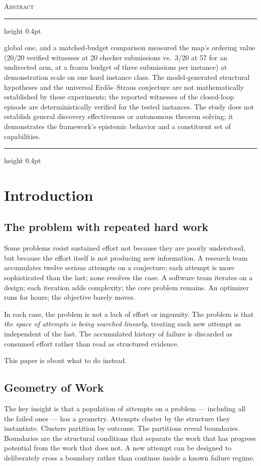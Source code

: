 \documentclass[11pt]{article}
\renewenvironment{abstract}{%
  \begin{center}
  \begin{minipage}{0.86\textwidth}
  \begin{center}{\normalfont\scshape\color{gowaccent}Abstract}\end{center}
  \vspace{0.4em}
  {\color{gowrule}\hrule height 0.4pt}
  \vspace{0.9em}
  \small\noindent\ignorespaces
}{%
  \vspace{0.9em}
  {\color{gowrule}\hrule height 0.4pt}
  \end{minipage}
  \end{center}
  \vspace{1.2em}
}
\theoremstyle{gowthm}
\theoremstyle{gowplain}
\begin{document}
\begin{abstract}
global one, and a matched-budget comparison measured the map's ordering value
(20/20 verified witnesses at 20 checker submissions vs.\ 3/20 at 57 for an
undirected arm, at a frozen budget of three submissions per instance) at
demonstration scale on one hard instance class. The model-generated structural
hypotheses and the universal Erd\H{o}s--Straus conjecture are not
mathematically established by these experiments; the reported witnesses of the
closed-loop episode are deterministically verified for the tested instances.
The study does not establish general discovery effectiveness or autonomous
theorem solving; it demonstrates the framework's epistemic behavior and a
constituent set of capabilities.
\end{abstract}

\section{Introduction}
\label{sec:intro}

\subsection{The problem with repeated hard work}

Some problems resist sustained effort not because they are poorly understood,
but because the effort itself is not producing new information. A research team
accumulates twelve serious attempts on a conjecture; each attempt is more
sophisticated than the last; none resolves the case. A software team iterates
on a design; each iteration adds complexity; the core problem remains. An
optimizer runs for hours; the objective barely moves.

In each case, the problem is not a lack of effort or ingenuity. The problem is
that \emph{the space of attempts is being searched linearly}, treating each new
attempt as independent of the last. The accumulated history of failure is
discarded as consumed effort rather than read as structured evidence.

This paper is about what to do instead.

\subsection{Geometry of Work}

The key insight is that a population of attempts on a problem --- including all
the failed ones --- has a geometry. Attempts cluster by the structure they
instantiate. Clusters partition by outcome. The partitions reveal boundaries.
Boundaries are the structural conditions that separate the work that has
progress potential from the work that does not. A new attempt can be designed
to deliberately cross a boundary rather than continue inside a known failure
regime.
\end{document}
